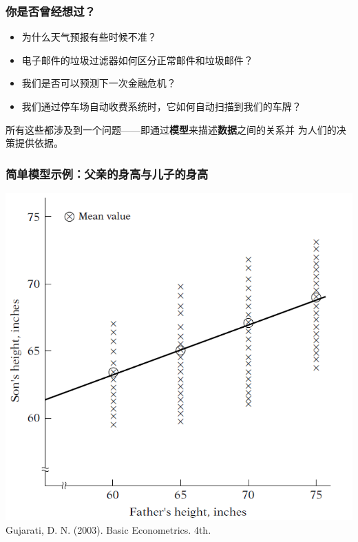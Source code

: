 \documentclass[11pt]{beamer}
\begin{document}
\begin{frame}
  \frametitle{你是否曾经想过？}

  \begin{itemize}
  \item 为什么天气预报有些时候不准？
  \item 电子邮件的垃圾过滤器如何区分正常邮件和垃圾邮件？
  \item 我们是否可以预测下一次金融危机？
  \item 我们通过停车场自动收费系统时，它如何自动扫描到我们的车牌？
  \end{itemize}
  \vspace{1cm}所有这些都涉及到一个问题——即通过\textbf{模型}来描述\textbf{数据}之间的关系并
  为人们的决策提供依据。
\end{frame}


\begin{frame}
  \frametitle{简单模型示例：父亲的身高与儿子的身高}
  \centering \includegraphics[height=0.8\textheight]{father_son}\\
  \tiny{Gujarati, D. N. (2003). Basic Econometrics. 4th.}
\end{frame}
\end{document}
